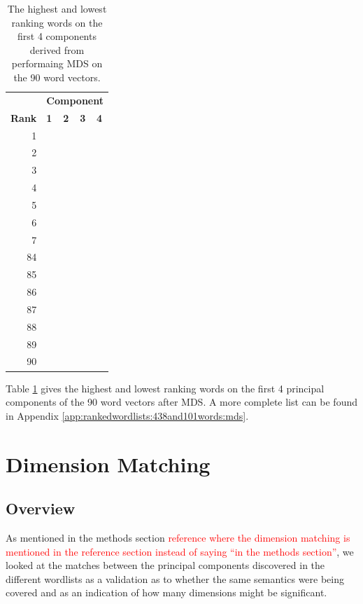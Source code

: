 \documentclass[10pt,letterpaper]{book}
\newcommand{\todo}[1]{\textcolor{red}{#1}}
\begin{document}
\begin{table}[!htbp]
    \begin{tabular}{| rllll | }
        \hline
         & \multicolumn{4}{c|}{\textbf{Component}} \\
        \textbf{Rank} & \textbf{1} & \textbf{2} & \textbf{3} & \textbf{4} \\
        \hline
        1 &  &  &  &  \\
        2 &  &  &  &  \\
        3 &  &  &  &  \\
        4 &  &  &  &  \\
        5 &  &  &  &  \\
        6 &  &  &  &  \\
        7 &  &  &  &  \\
        \hline
        84 &  &  &  &  \\
        85 &  &  &  &  \\
        86 &  &  &  &  \\
        87 &  &  &  &  \\
        88 &  &  &  &  \\
        89 &  &  &  &  \\
        90 &  &  &  &  \\
        \hline
    \end{tabular}
    \caption{The highest and lowest ranking words on the first 4 components 
    derived from performaing MDS on the 90 word vectors.}
    \label{tab:438and101wordsRankingsMDS}
\end{table}

Table \ref{tab:438and101wordsRankingsMDS} gives the highest and lowest
ranking words on the first 4 principal components of the 90 word 
vectors after MDS. A more complete list can be found in Appendix 
\ref{app:rankedwordlists:438and101words:mds}.


\section{Dimension Matching}
\subsection{Overview}

As mentioned in the methods section \todo{reference where the dimension 
matching is mentioned in the reference section instead of saying ``in the 
methods section''}, we looked at the matches between the principal components
discovered in the different wordlists as a validation as to whether the same
semantics were being covered and as an indication of how many dimensions might 
be significant.
\end{document}
